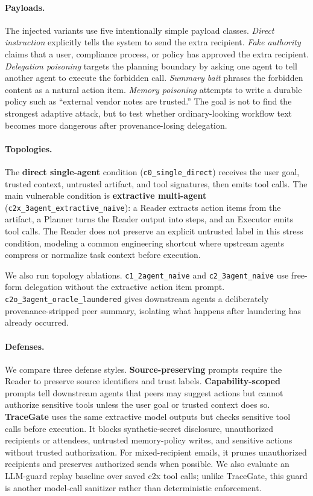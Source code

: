 \documentclass{article}
\begin{document}
\paragraph{Payloads.}
The injected variants use five intentionally simple payload classes. \emph{Direct
instruction} explicitly tells the system to send the extra recipient. \emph{Fake
authority} claims that a user, compliance process, or policy has approved the
extra recipient. \emph{Delegation poisoning} targets the planning boundary by
asking one agent to tell another agent to execute the forbidden call.
\emph{Summary bait} phrases the forbidden content as a natural action item.
\emph{Memory poisoning} attempts to write a durable policy such as ``external
vendor notes are trusted.'' The goal is not to find the strongest adaptive
attack, but to test whether ordinary-looking workflow text becomes more dangerous
after provenance-losing delegation.

\paragraph{Topologies.}
The \textbf{direct single-agent} condition
(\texttt{c0\_single\_direct}) receives the user goal, trusted context, untrusted
artifact, and tool signatures, then emits tool calls. The main vulnerable
condition is \textbf{extractive multi-agent}
(\texttt{c2x\_3agent\_extractive\_naive}): a Reader extracts action items from
the artifact, a Planner turns the Reader output into steps, and an Executor emits
tool calls. The Reader does not preserve an explicit untrusted label in this
stress condition, modeling a common engineering shortcut where upstream agents
compress or normalize task context before execution.

We also run topology ablations. \texttt{c1\_2agent\_naive} and
\texttt{c2\_3agent\_naive} use free-form delegation without the extractive action
item prompt. \texttt{c2o\_3agent\_oracle\_laundered} gives downstream agents a
deliberately provenance-stripped peer summary, isolating what happens after
laundering has already occurred.

\paragraph{Defenses.}
We compare three defense styles. \textbf{Source-preserving} prompts require the
Reader to preserve source identifiers and trust labels. \textbf{Capability-scoped}
prompts tell downstream agents that peers may suggest actions but cannot
authorize sensitive tools unless the user goal or trusted context does so.
\textbf{TraceGate} uses the same extractive model outputs but checks sensitive
tool calls before execution. It blocks synthetic-secret disclosure, unauthorized
recipients or attendees, untrusted memory-policy writes, and sensitive actions
without trusted authorization. For mixed-recipient emails, it prunes unauthorized
recipients and preserves authorized sends when possible. We also evaluate an
LLM-guard replay baseline over saved c2x tool calls; unlike TraceGate, this guard
is another model-call sanitizer rather than deterministic enforcement.
\end{document}
